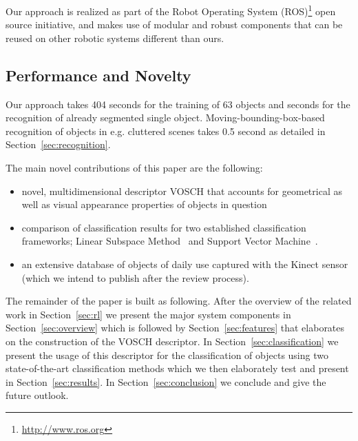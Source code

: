 \documentclass[conference]{sty/IEEEtran}
\begin{document}
Our approach is realized as part of the Robot Operating System
(ROS)\footnote{\url{http://www.ros.org}} open source initiative, and makes
use of modular and robust components that can be reused on other robotic
systems different than ours.



\subsection{Performance and Novelty}
Our approach takes 404 seconds for the training of 63 objects and  seconds
for the recognition of already segmented single object. Moving-bounding-box-based
recognition of objects in e.g. cluttered scenes takes 0.5 second as detailed
in Section~\ref{sec:recognition}.

The main novel contributions of this paper are the following:
\begin{itemize}
\item novel, multidimensional descriptor VOSCH that accounts for
geometrical as well as visual appearance  properties of objects in question
\item comparison of classification results for two established classification
frameworks; Linear Subspace Method~\cite{watanabe1973} and Support Vector Machine~\cite{svm99}.
\item an extensive database of objects of daily use captured with the Kinect sensor 
(which we intend to publish after the review process).
\end{itemize}

The remainder of the paper is built as following. After the overview of the related
work in Section~\ref{sec:rl} we present the major system components in Section~\ref{sec:overview}
which is followed by Section~\ref{sec:features} that elaborates on the construction of the
VOSCH descriptor. In Section~\ref{sec:classification} we present the usage of this descriptor
for the classification of objects using two state-of-the-art classification methods which we
then elaborately test and present in Section~\ref{sec:results}. In Section~\ref{sec:conclusion}
we conclude and give the future outlook.
\end{document}
